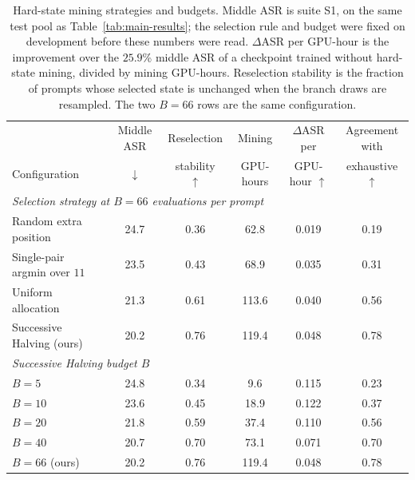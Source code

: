 \documentclass[11pt]{article}
\newcommand{\asr}{ASR}
\begin{document}
\begin{table}[t]
  \centering
  \footnotesize
  \setlength{\tabcolsep}{5pt}
  \begin{tabular}{lccccc}
    \toprule
    & Middle \asr{} & Reselection & Mining
    & \(\Delta\)\asr{} per & Agreement with \\
    Configuration & \(\downarrow\) & stability \(\uparrow\)
    & GPU-hours & GPU-hour \(\uparrow\) & exhaustive \(\uparrow\) \\
    \midrule
    \multicolumn{6}{l}{\emph{Selection strategy at \(B=66\) evaluations per prompt}} \\
    Random extra position          & 24.7 & 0.36 & 62.8  & 0.019 & 0.19 \\
    Single-pair argmin over \(11\) & 23.5 & 0.43 & 68.9  & 0.035 & 0.31 \\
    Uniform allocation             & 21.3 & 0.61 & 113.6 & 0.040 & 0.56 \\
    Successive Halving (ours)      & 20.2 & 0.76 & 119.4 & 0.048 & 0.78 \\
    \midrule
    \multicolumn{6}{l}{\emph{Successive Halving budget \(B\)}} \\
    \(B=5\)                        & 24.8 & 0.34 & 9.6   & 0.115 & 0.23 \\
    \(B=10\)                       & 23.6 & 0.45 & 18.9  & 0.122 & 0.37 \\
    \(B=20\)                       & 21.8 & 0.59 & 37.4  & 0.110 & 0.56 \\
    \(B=40\)                       & 20.7 & 0.70 & 73.1  & 0.071 & 0.70 \\
    \(B=66\) (ours)                & 20.2 & 0.76 & 119.4 & 0.048 & 0.78 \\
    \bottomrule
  \end{tabular}
  \caption{Hard-state mining strategies and budgets. Middle \asr{} is suite S1,
  on the same test pool as Table~\ref{tab:main-results}; the selection rule and
  budget were fixed on development before these numbers were read.
  \(\Delta\)\asr{} per
  GPU-hour is the improvement over the \(25.9\)\% middle \asr{} of a
  checkpoint trained without hard-state mining, divided by mining GPU-hours.
  Reselection stability is the fraction of prompts whose selected state is
  unchanged when the branch draws are resampled. The two \(B{=}66\) rows are the
  same configuration.}
  \label{tab:mining}
\end{table}
\end{document}
